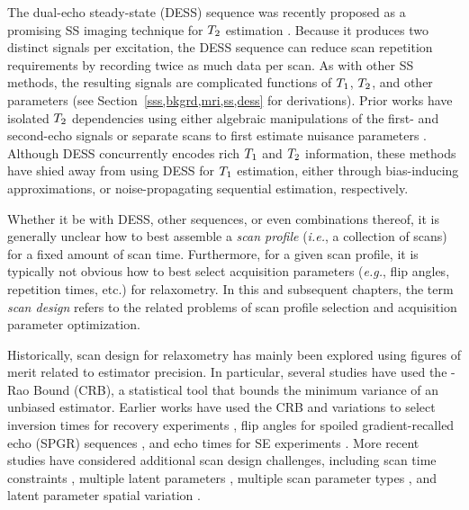 The dual-echo steady-state (DESS) sequence \cite{bruder:88:ans} 
was recently proposed as a promising SS imaging technique 
for $T_2$ estimation \cite{welsch:09:reo}. 
Because it produces two distinct signals per excitation, 
the DESS sequence can reduce scan repetition requirements 
by recording twice as much data per scan. 
As with other SS methods, 
the resulting signals 
\cite{gyngell:89:tss, hanicke:03:aas} 
are complicated functions 
of $T_1$, $T_2$, and other parameters
(see Section~\ref{sss,bkgrd,mri,ss,dess}
for derivations). 
Prior works have isolated $T_2$ dependencies 
using either algebraic manipulations 
of the first- and second-echo signals 
\cite{welsch:09:reo, heule:14:reo} 
or separate scans to first estimate nuisance parameters 
\cite{nataraj:14:mbe}. 
Although DESS concurrently encodes rich $T_1$ and $T_2$ information, 
these methods have shied away from using DESS 
for $T_1$ estimation, 
either through bias-inducing approximations, 
or noise-propagating sequential estimation, 
respectively. 

Whether it be with DESS, other sequences, or even combinations thereof, 
it is generally unclear how to best assemble a \emph{scan profile} 
(\emph{i.e.}, a collection of scans) 
for a fixed amount of scan time. 
Furthermore, for a given scan profile, 
it is typically not obvious how 
to best select acquisition parameters 
(\emph{e.g.}, flip angles, repetition times, etc.) 
for relaxometry. 
In this and subsequent chapters, 
the term \emph{scan design} refers 
to the related problems 
of scan profile selection 
and acquisition parameter optimization.

Historically, scan design for relaxometry
has mainly been explored 
using figures of merit related to estimator precision. 
In particular, several studies have used the \Cramer-Rao Bound (CRB), 
a statistical tool that bounds the minimum variance of an unbiased estimator.
Earlier works have used the CRB and variations 
to select inversion times for recovery experiments 
\cite{weiss:80:tco, zhang:98:dos}, 
flip angles for spoiled gradient-recalled echo (SPGR) sequences \cite{wang:87:otp}, 
and echo times for SE experiments \cite{jones:96:oss}. 
More recent studies have considered additional scan design challenges, 
including scan time constraints \cite{imran:99:tpm}, 
multiple latent parameters \cite{deoni:04:doo}, 
multiple scan parameter types \cite{fleysher:07:otp}, 
and latent parameter spatial variation 
\cite{akcakaya:15:ots, lewis:16:ddo, liu:17:gmm}. 

